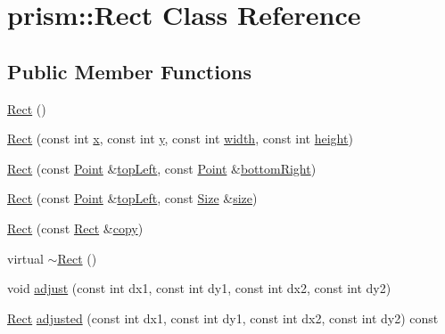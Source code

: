 \hypertarget{classprism_1_1_rect}{}\section{prism\+:\+:Rect Class Reference}
\label{classprism_1_1_rect}
\subsection*{Public Member Functions}
\begin{DoxyCompactItemize}
\item 
\hyperlink{classprism_1_1_rect_af61646ec28b099ffe1b4901ae5639662}{Rect} ()
\item 
\hyperlink{classprism_1_1_rect_a80055d4dfd1f9feb803a4419cd43671d}{Rect} (const int \hyperlink{classprism_1_1_rect_a202fa9a56964c9111a968fb9b420f5f4}{x}, const int \hyperlink{classprism_1_1_rect_a6e951744e0bba0fed781b86ab0be680b}{y}, const int \hyperlink{classprism_1_1_rect_a8dae47a50fdac7a5f7e8aabef68437aa}{width}, const int \hyperlink{classprism_1_1_rect_ad713f4536accdc6d5d2e6a6d83eac78b}{height})
\item 
\hyperlink{classprism_1_1_rect_a62e6eaa2eba9506e830bd6f3ff817bca}{Rect} (const \hyperlink{classprism_1_1_point}{Point} \&\hyperlink{classprism_1_1_rect_a2900a6e837124886d2e6aa500fba5bde}{top\+Left}, const \hyperlink{classprism_1_1_point}{Point} \&\hyperlink{classprism_1_1_rect_a97eb5a66441a49c7e149229376aba6a0}{bottom\+Right})
\item 
\hyperlink{classprism_1_1_rect_afda4a2a6cc3bdfd2e4e213813f6d0653}{Rect} (const \hyperlink{classprism_1_1_point}{Point} \&\hyperlink{classprism_1_1_rect_a2900a6e837124886d2e6aa500fba5bde}{top\+Left}, const \hyperlink{classprism_1_1_size}{Size} \&\hyperlink{classprism_1_1_rect_adcbe6d279ad57294c88d287057867a2b}{size})
\item 
\hyperlink{classprism_1_1_rect_a03f9f2832b8f325ded900d85b2d12ea3}{Rect} (const \hyperlink{classprism_1_1_rect}{Rect} \&\hyperlink{namespaceprism_ae776f4cd825f79e7af1cf6ee1d90a209}{copy})
\item 
virtual \hyperlink{classprism_1_1_rect_a219b359c4a5f5252e697cc6e7dcd31a4}{$\sim$\+Rect} ()
\item 
void \hyperlink{classprism_1_1_rect_a8bbcfbe99d39f7350dc7801ed5cf6d48}{adjust} (const int dx1, const int dy1, const int dx2, const int dy2)
\item 
\hyperlink{classprism_1_1_rect}{Rect} \hyperlink{classprism_1_1_rect_aa0101c79f105eb2b988d3814e00be511}{adjusted} (const int dx1, const int dy1, const int dx2, const int dy2) const 

\end{DoxyCompactItemize}
